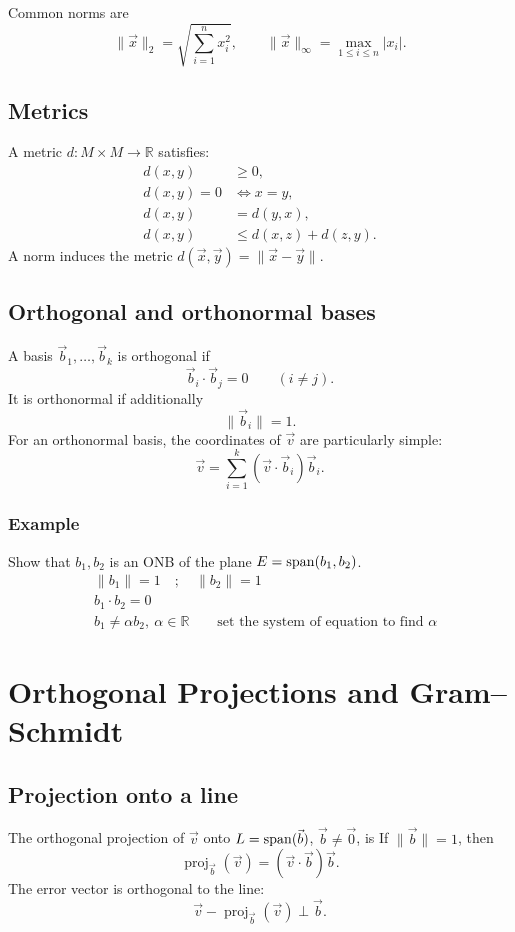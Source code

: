 \documentclass{article}
\begin{document}
Common norms are
\[
    \lVert\vec{x}\rVert_2
    =\sqrt{\sum_{i=1}^{n}x_i^2},
    \qquad
    \lVert\vec{x}\rVert_\infty
    =\max_{1\leq i\leq n}|x_i|.
\]

\subsection{Metrics}
A metric $d:M\times M\to\mathbb{R}$ satisfies:
\begin{align*}
    d(x,y)&\geq0,\\
    d(x,y)=0&\Longleftrightarrow x=y,\\
    d(x,y)&=d(y,x),\\
    d(x,y)&\leq d(x,z)+d(z,y).
\end{align*}
A norm induces the metric $d(\vec{x},\vec{y})
=\lVert\vec{x}-\vec{y}\rVert$.

\subsection{Orthogonal and orthonormal bases}
A basis $\vec{b}_1,\dots,\vec{b}_k$ is orthogonal if
\[
    \vec{b}_i\cdot\vec{b}_j=0\qquad(i\neq j).
\]
It is orthonormal if additionally
\[
    \lVert\vec{b}_i\rVert=1.
\]
For an orthonormal basis, the coordinates of $\vec{v}$ are particularly
simple:
\[
    \vec{v}=\sum_{i=1}^{k}(\vec{v}\cdot\vec{b}_i)\vec{b}_i.
\]

\subsubsection{Example}
Show that $b_1,b_2$ is an ONB of the plane $E = \operatorname{span}(b_1,b_2)$.
\begin{align*}
    &\left\|b_1\right\| = 1\quad ; \quad \left\|b_2\right\| = 1\\
    &b_1 \cdot b_2 = 0\\
    &b_1 \neq \alpha b_2,\ \alpha \in \mathbb{R}\qquad \text{set the system of equation to find }\alpha
\end{align*}

\section{Orthogonal Projections and Gram--Schmidt}

\subsection{Projection onto a line}
The orthogonal projection of $\vec{v}$ onto
$L=\operatorname{span}(\vec{b})$, $\vec{b}\neq\vec{0}$, is
If $\lVert\vec{b}\rVert=1$, then
\[
    \operatorname{proj}_{\vec{b}}(\vec{v})
    =(\vec{v}\cdot\vec{b})\vec{b}.
\]
The error vector is orthogonal to the line:
\[
    \vec{v}-\operatorname{proj}_{\vec{b}}(\vec{v})
    \perp\vec{b}.
\]
\end{document}

